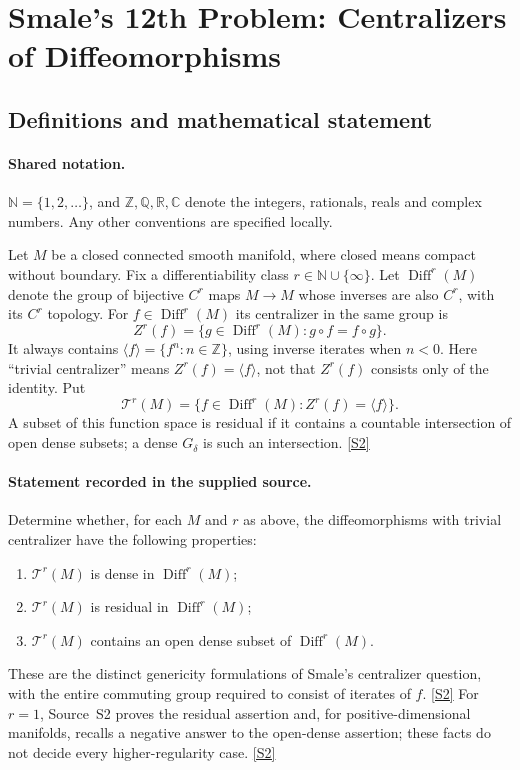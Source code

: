 \documentclass[11pt]{article}
\newcommand{\sref}[2]{\hyperlink{source:#1:#2}{[S#2]}}
\begin{document}
\section{Smale's 12th Problem: Centralizers of Diffeomorphisms}\label{statement}

\subsection{Definitions and mathematical statement}

\paragraph{Shared notation.}$\mathbb N=\{1,2,\ldots\}$, and $\mathbb Z,\mathbb Q,\mathbb R,\mathbb C$ denote the integers, rationals, reals and complex numbers. Any other conventions are specified locally.


Let $M$ be a closed connected smooth manifold, where closed means compact without boundary. Fix a differentiability class $r\in\mathbb N\cup\{\infty\}$. Let $\operatorname{Diff}^r(M)$ denote the group of bijective $C^r$ maps $M\to M$ whose inverses are also $C^r$, with its $C^r$ topology. For $f\in\operatorname{Diff}^r(M)$ its centralizer in the same group is
\[
 Z^r(f)=\{g\in\operatorname{Diff}^r(M):g\circ f=f\circ g\}.
\]
It always contains $\langle f\rangle=\{f^n:n\in\mathbb Z\}$, using inverse iterates when $n<0$. Here ``trivial centralizer'' means $Z^r(f)=\langle f\rangle$, not that $Z^r(f)$ consists only of the identity. Put
\[
 \mathcal T^r(M)=\{f\in\operatorname{Diff}^r(M):Z^r(f)=\langle f\rangle\}.
\]
A subset of this function space is residual if it contains a countable intersection of open dense subsets; a dense $G_\delta$ is such an intersection. \sref{statement}{2}
\paragraph{Statement recorded in the supplied source.}
Determine whether, for each $M$ and $r$ as above, the diffeomorphisms with trivial centralizer have the following properties:
\begin{enumerate}
\item $\mathcal T^r(M)$ is dense in $\operatorname{Diff}^r(M)$;
\item $\mathcal T^r(M)$ is residual in $\operatorname{Diff}^r(M)$;
\item $\mathcal T^r(M)$ contains an open dense subset of $\operatorname{Diff}^r(M)$.
\end{enumerate}
These are the distinct genericity formulations of Smale's centralizer question, with the entire commuting group required to consist of iterates of $f$. \sref{statement}{2}
For $r=1$, Source~S2 proves the residual assertion and, for positive-dimensional manifolds, recalls a negative answer to the open-dense assertion; these facts do not decide every higher-regularity case. \sref{statement}{2}
\end{document}
